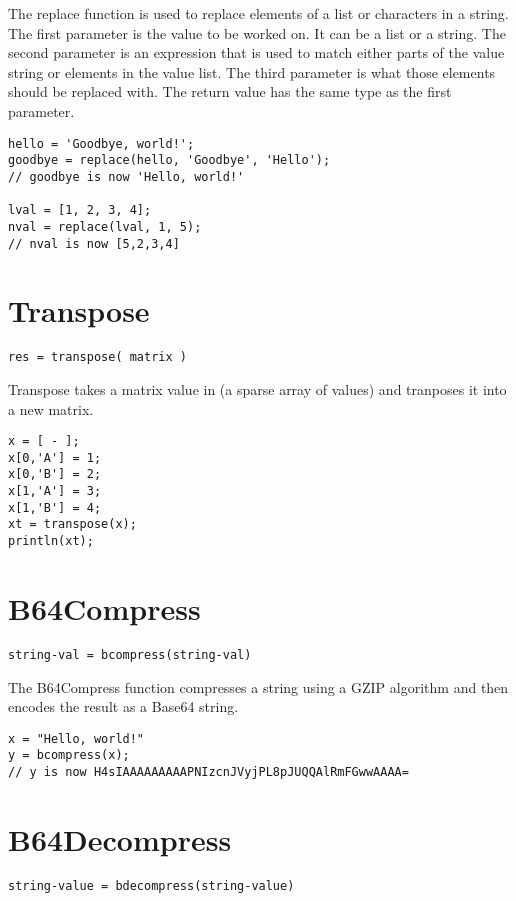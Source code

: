The replace function is used to replace elements of a list or characters in a string. The
first parameter is the value to be worked on. It can be a list or a string. The second parameter is
an expression that is used to match either parts of the value string or elements in the value list. The third
parameter is what those elements should be replaced with. The return value has the same type
as the first parameter.

\begin{lstlisting}[caption={replace example}]
hello = 'Goodbye, world!';
goodbye = replace(hello, 'Goodbye', 'Hello');
// goodbye is now 'Hello, world!'

lval = [1, 2, 3, 4];
nval = replace(lval, 1, 5);
// nval is now [5,2,3,4]
\end{lstlisting}

\section{Transpose}
\begin{Verbatim}
res = transpose( matrix )
\end{Verbatim}

Transpose takes a matrix value in \Reflex (a sparse array of values) and tranposes it
into a new matrix.

\begin{lstlisting}[caption={tranpose example}]
x = [ - ];
x[0,'A'] = 1;
x[0,'B'] = 2;
x[1,'A'] = 3;
x[1,'B'] = 4;
xt = transpose(x);
println(xt);

\end{lstlisting}

\section{B64Compress}
\begin{Verbatim}
string-val = bcompress(string-val)
\end{Verbatim}

The B64Compress function compresses a string using a GZIP algorithm and then encodes the result as a Base64 string.
\begin{lstlisting}[caption={bcompress example}]
x = "Hello, world!"
y = bcompress(x);
// y is now H4sIAAAAAAAAAPNIzcnJVyjPL8pJUQQAlRmFGwwAAAA=

\end{lstlisting}

\section{B64Decompress}
\begin{Verbatim}
string-value = bdecompress(string-value)
\end{Verbatim}

